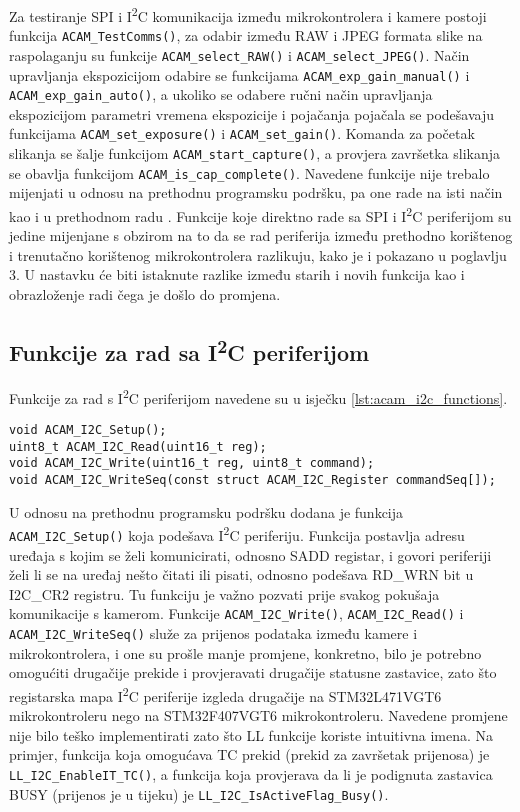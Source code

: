 Za testiranje SPI i I\textsuperscript{2}C komunikacija između mikrokontrolera i kamere postoji funkcija \verb|ACAM_TestComms()|, za odabir između RAW i JPEG formata slike na raspolaganju su funkcije \verb|ACAM_select_RAW()| i \verb|ACAM_select_JPEG()|. Način upravljanja ekspozicijom odabire se funkcijama \verb|ACAM_exp_gain_manual()| i \verb|ACAM_exp_gain_auto()|, a ukoliko se odabere ručni način upravljanja ekspozicijom parametri vremena ekspozicije i pojačanja pojačala se podešavaju funkcijama \verb|ACAM_set_exposure()| i \verb|ACAM_set_gain()|. Komanda za početak slikanja se šalje funkcijom \verb|ACAM_start_capture()|, a provjera završetka slikanja se obavlja funkcijom \verb|ACAM_is_cap_complete()|. Navedene funkcije nije trebalo mijenjati u odnosu na prethodnu programsku podršku, pa one rade na isti način kao i u prethodnom radu \cite{diplomski_goran_petrak}. Funkcije koje direktno rade sa SPI i I\textsuperscript{2}C periferijom su jedine mijenjane s obzirom na to da se rad periferija između prethodno korištenog i trenutačno korištenog mikrokontrolera razlikuju, kako je i pokazano u poglavlju 3. U nastavku će biti istaknute razlike između starih i novih funkcija kao i obrazloženje radi čega je došlo do promjena.

\subsection{Funkcije za rad sa I\textsuperscript{2}C periferijom}

Funkcije za rad s I\textsuperscript{2}C periferijom navedene su u isječku \ref{lst:acam_i2c_functions}.

\begin{lstlisting}[caption=Funkcije za rad s I\textsuperscript{2}C periferijom, label={lst:acam_i2c_functions}]
void ACAM_I2C_Setup();
uint8_t ACAM_I2C_Read(uint16_t reg);
void ACAM_I2C_Write(uint16_t reg, uint8_t command);
void ACAM_I2C_WriteSeq(const struct ACAM_I2C_Register commandSeq[]);
\end{lstlisting}

U odnosu na prethodnu programsku podršku dodana je funkcija \verb|ACAM_I2C_Setup()| koja podešava I\textsuperscript{2}C periferiju. Funkcija postavlja adresu uređaja s kojim se želi komunicirati, odnosno SADD registar, i govori periferiji želi li se na uređaj nešto čitati ili pisati, odnosno podešava RD\_WRN bit u I2C\_CR2 registru. Tu funkciju je važno pozvati prije svakog pokušaja komunikacije s kamerom. Funkcije \verb|ACAM_I2C_Write()|,  \verb|ACAM_I2C_Read()| i \verb|ACAM_I2C_WriteSeq()| služe za prijenos podataka između kamere i mikrokontrolera, i one su prošle manje promjene, konkretno, bilo je potrebno omogućiti drugačije prekide i provjeravati drugačije statusne zastavice, zato što registarska mapa I\textsuperscript{2}C periferije izgleda drugačije na STM32L471VGT6 mikrokontroleru nego na STM32F407VGT6 mikrokontroleru. Navedene promjene nije bilo teško implementirati zato što LL funkcije koriste intuitivna imena. Na primjer, funkcija koja omogućava TC prekid (prekid za završetak prijenosa) je \verb|LL_I2C_EnableIT_TC()|, a funkcija koja provjerava da li je podignuta zastavica BUSY (prijenos je u tijeku) je \verb|LL_I2C_IsActiveFlag_Busy()|.

